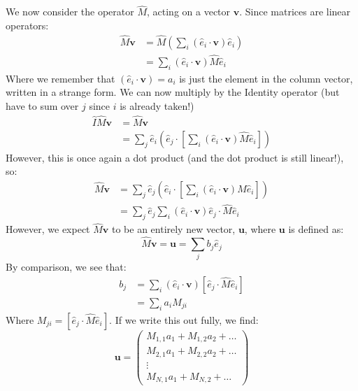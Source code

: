\documentclass[a4paper,openany,11pt]{book}
\renewcommand\vec[1]{\boldsymbol{\mathbf{#1}}}
\begin{document}
			We now consider the operator $\hat{M}$, acting on a vector $\vec{v}$. Since matrices are linear operators:
			\begin{align}
				\hat{M} \vec{v} & = \hat{M} \left( \sum_i (\hat{e}_i  \cdot \vec{v} ) \hat{e}_i \right)
				\\
				& = \sum_i (\hat{e}_i  \cdot \vec{v} )  \hat{M} \hat{e}_i
			\end{align}
			Where we remember that $(\hat{e}_i  \cdot \vec{v} ) = a_i$ is just the element in the column vector, written in a strange form. We can now multiply by the Identity operator (but have to sum over $j$ since $i$ is already taken!)
			\begin{align}
				\hat{I} \hat{M} \vec{v} & = \hat{M} \vec{v} 
				\\
				& = \sum_j \hat{e}_i \left( \hat{e}_j \cdot \left[\sum_i (\hat{e}_i  \cdot \vec{v} )  \hat{M} \hat{e}_i\right]\right)
			\end{align}
			However, this is once again a dot product (and the dot product is still linear!), so:
			\begin{align}
				\hat{M} \vec{v} & = \sum_j \hat{e}_j \left( \hat{e}_i \cdot \left[\sum_i (\hat{e}_i  \cdot \vec{v} ) \hat{M} \hat{e}_i\right]\right) 
				\\
				& = \sum_j \hat{e}_j \sum_i (\hat{e}_i \cdot \vec{v}) \hat{e}_j \cdot \hat{M} \hat{e}_i
			\end{align}
			However, we expect $\hat{M} \vec{v}$ to be an entirely new vector, $\vec{u}$, where $\vec{u}$ is defined as:
			\begin{equation}
				\hat{M}\vec{v} = \vec{u} = \sum_j b_j \hat{e}_j
			\end{equation}
			By comparison, we see that:
			\begin{align}
				b_j &  =  \sum_i (\hat{e}_i  \cdot \vec{v} ) \left[\hat{e}_j \cdot \hat{M} \hat{e}_i \right]
				\\
				& = \sum_i a_i M_{ji}
			\end{align}
			Where $M_{ji} = \left[\hat{e}_j \cdot \hat{M} \hat{e}_i \right]$.
			If we write this out fully, we find:
			\begin{equation}
				\vec{u} = \begin{pmatrix} M_{1,1} a_1 + M_{1,2} a_2 + \dots 
					\\
					M_{2,1} a_1 + M_{2,2} a_2 + \dots 
					\\
					\vdots
					\\
					M_{N,1} a_1 + M_{N,2} + \dots\end{pmatrix} \label{Eq:MatMult}
			\end{equation}
\end{document}
